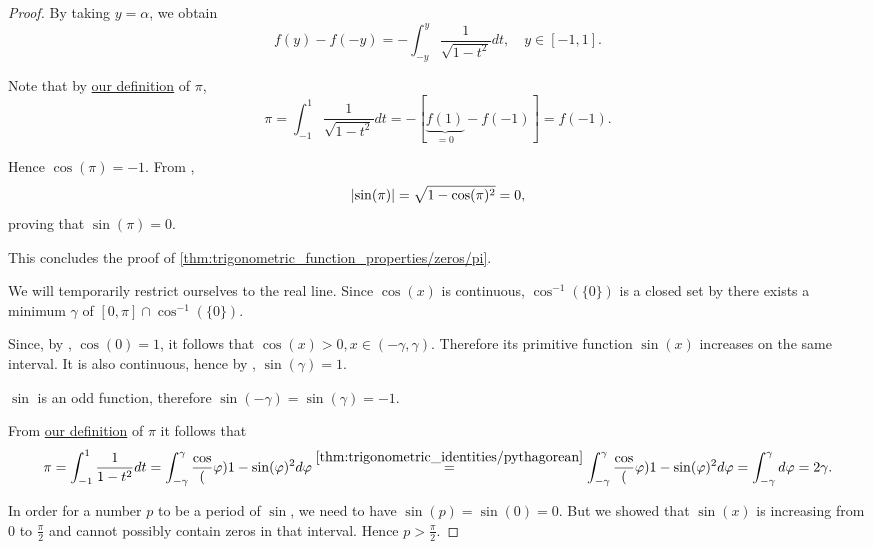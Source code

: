 \begin{proof}
  By taking \( y = \alpha \), we obtain
  \begin{equation*}
    f(y) - f(-y) = -\int_{-y}^y \frac 1 {\sqrt{1 - t^2}} dt, \quad y \in [-1, 1].
  \end{equation*}

  Note that by \hyperref[def:pi]{our definition} of \( \pi \),
  \begin{equation*}
    \pi
    =
    \int_{-1}^1 \frac 1 {\sqrt{1 - t^2}} dt
    =
    -[\underbrace{f(1)}_{=0} - f(-1)]
    =
    f(-1).
  \end{equation*}

  Hence \( \cos(\pi) = -1 \). From ,
  \begin{equation*}
    \left\vert \sin(\pi) \right\vert = \sqrt{1 - \cos(\pi)^2} = 0,
  \end{equation*}
  proving that \( \sin(\pi) = 0 \).

  This concludes the proof of \ref{thm:trigonometric_function_properties/zeros/pi}.

   We will temporarily restrict ourselves to the real line. Since \( \cos(x) \) is continuous, \( \cos^{-1}(\{ 0 \}) \) is a closed set by  there exists a minimum \( \gamma \) of \( [0, \pi] \cap \cos^{-1}(\{ 0 \}) \).

  Since, by , \( \cos(0) = 1 \), it follows that \( \cos(x) > 0, x \in (-\gamma, \gamma) \). Therefore its primitive function \( \sin(x) \) increases on the same interval. It is also continuous, hence by , \( \sin(\gamma) = 1 \).

  \( \sin \) is an odd function, therefore \( \sin(-\gamma) = \sin(\gamma) = -1 \).

  From \hyperref[def:pi]{our definition} of \( \pi \) it follows that
  \begin{equation*}
    \pi
    =
    \int_{-1}^1 \frac 1 {1 - t^2} dt
    =
    \int_{-\gamma}^\gamma \frac \cos(\varphi) {1 - \sin(\varphi)^2} d\varphi
    \overset {\ref{thm:trigonometric_identities/pythagorean}} =
    \int_{-\gamma}^\gamma \frac \cos(\varphi) {1 - \sin(\varphi)^2} d\varphi
    =
    \int_{-\gamma}^\gamma d\varphi
    =
    2\gamma.
  \end{equation*}

  In order for a number \( p \) to be a period of \( \sin \), we need to have \( \sin(p) = \sin(0) = 0 \). But we showed that \( \sin(x) \) is increasing from \( 0 \) to \( \tfrac \pi 2 \) and cannot possibly contain zeros in that interval. Hence \( p > \tfrac \pi 2 \).


\end{proof}
